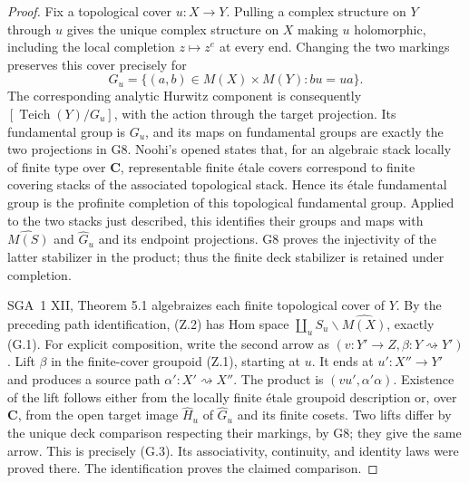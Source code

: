 \begin{proof}
Fix a topological cover $u:X\to Y$. Pulling a complex structure on
$Y$ through $u$ gives the unique complex structure on $X$ making $u$
holomorphic, including the local completion $z\mapsto z^e$ at every
end. Changing the two markings preserves this cover precisely for
\[
        G_u=\{(a,b)\in M(X)\times M(Y):bu=ua\}.
\]
The corresponding analytic Hurwitz component is consequently
$[\operatorname{Teich}(Y)/G_u]$, with the action through the target
projection. Its fundamental group is $G_u$, and its maps on fundamental
groups are exactly the two projections in G8. Noohi's opened
\cite[Theorem 20.4]{G_Noohi2005} states that, for an algebraic stack
locally of finite type over $\mathbf C$, representable finite \'etale
covers correspond to finite covering stacks of the associated
topological stack. Hence its \'etale fundamental group is the profinite
completion of this topological fundamental group. Applied to the two
stacks just described, this identifies their groups and maps with
$\widehat{M(S)}$ and $\widehat G_u$ and its endpoint projections.
G8 proves the injectivity of the latter stabilizer in the product;
thus the finite deck stabilizer is retained under completion.

SGA~1 XII, Theorem 5.1 algebraizes each finite topological cover of
$Y$. By the preceding path identification, (Z.2) has Hom space
$\coprod_u S_u\backslash\widehat{M(X)}$, exactly (G.1).
For explicit composition, write the second arrow as $(v:Y'\to Z,
\beta:Y\rightsquigarrow Y')$. Lift $\beta$ in the finite-cover
groupoid (Z.1), starting at $u$. It ends at $u':X''\to Y'$ and
produces a source path $\alpha':X'\rightsquigarrow X''$. The product
is $(v u',\alpha'\alpha)$. Existence of the lift follows either from
the locally finite \'etale groupoid description or, over $\mathbf C$,
from the open target image $\widehat H_u$ of $\widehat G_u$ and
its finite cosets. Two lifts differ by the unique deck comparison
respecting their markings, by G8; they give the same arrow. This is
precisely (G.3). Its associativity, continuity, and identity laws were
proved there. The identification proves the claimed comparison.


\end{proof}
